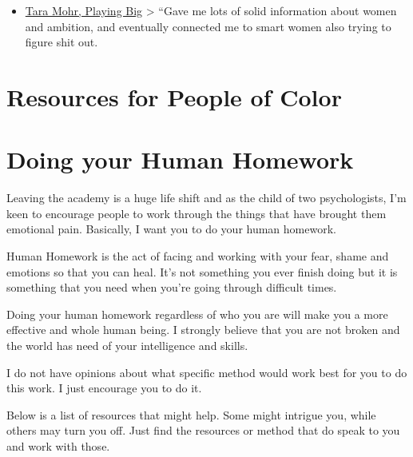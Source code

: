 \documentclass[]{book}
\providecommand{\tightlist}{%
  \setlength{\itemsep}{0pt}\setlength{\parskip}{0pt}}
\theoremstyle{definition}
\theoremstyle{definition}
\theoremstyle{definition}
\theoremstyle{remark}
\begin{document}
\begin{itemize}
\tightlist
\item
  \href{https://www.taramohr.com/book/}{Tara Mohr, Playing Big}
  \textgreater{} ``Gave me lots of solid information about women and
  ambition, and eventually connected me to smart women also trying to
  figure shit out.
\end{itemize}

\section{Resources for People of
Color}\label{resources-for-people-of-color}

\section{Doing your Human Homework}\label{doing-your-human-homework}

Leaving the academy is a huge life shift and as the child of two
psychologists, I'm keen to encourage people to work through the things
that have brought them emotional pain. Basically, I want you to do your
human homework.

Human Homework is the act of facing and working with your fear, shame
and emotions so that you can heal. It's not something you ever finish
doing but it is something that you need when you're going through
difficult times.

Doing your human homework regardless of who you are will make you a more
effective and whole human being. I strongly believe that you are not
broken and the world has need of your intelligence and skills.

I do not have opinions about what specific method would work best for
you to do this work. I just encourage you to do it.

Below is a list of resources that might help. Some might intrigue you,
while others may turn you off. Just find the resources or method that do
speak to you and work with those.
\end{document}
